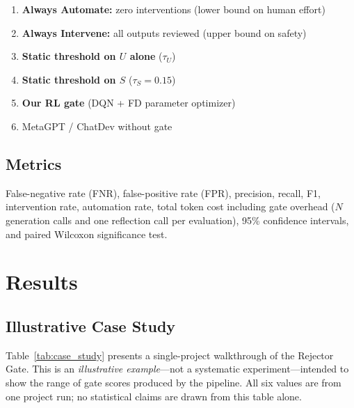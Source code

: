 \documentclass[conference]{IEEEtran}
\begin{document}
\begin{enumerate}
  \item \textbf{Always Automate:} zero interventions (lower bound on human effort)
  \item \textbf{Always Intervene:} all outputs reviewed (upper bound on safety)
  \item \textbf{Static threshold on $U$ alone} ($\tau_U$)
  \item \textbf{Static threshold on $S$} ($\tau_S{=}0.15$)
  \item \textbf{Our RL gate} (DQN + FD parameter optimizer)
  \item MetaGPT / ChatDev without gate
\end{enumerate}

\subsection{Metrics}

False-negative rate (FNR), false-positive rate (FPR), precision, recall,
F1, intervention rate, automation rate, total token cost including gate
overhead ($N$ generation calls and one reflection call per evaluation),
95\% confidence intervals, and paired Wilcoxon significance test.

\section{Results}\label{sec:results}

\subsection{Illustrative Case Study}

Table~\ref{tab:case_study} presents a single-project walkthrough of the
Rejector Gate.
This is an \emph{illustrative example}---not a systematic experiment---intended
to show the range of gate scores produced by the pipeline.
All six values are from one project run; no statistical claims are drawn
from this table alone.
\end{document}
